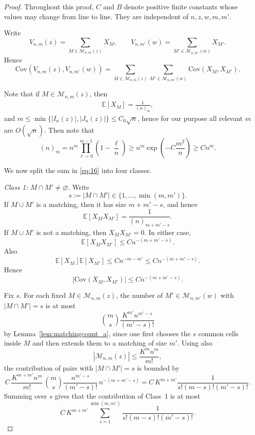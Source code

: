 \documentclass[11pt]{article}
\newcommand{\abs}[1]{| #1|}
\newcommand{\cov}{\mathrm{Cov}}
\begin{document}
\begin{proof} 
Throughout this proof, $C$ and $B$ denote positive finite constants whose values may change from line to line. They are independent of $n,z,w,m,m'$. 

Write
\[
V_{n,m}(z)=\sum_{M\in\mathcal M_{n,m}(z)} X_M,
\qquad
V_{n,m'}(w)=\sum_{M'\in\mathcal M_{n,m'}(w)} X_{M'}.
\]
Hence
\begin{equation}
\cov(V_{n,m}(z),V_{n,m'}(w))
=
\sum_{M\in\mathcal M_{n,m}(z)}
\sum_{M'\in\mathcal M_{n,m'}(w)}
\cov(X_M,X_{M'}).
\label{eq:16}
\end{equation}


Note that if $M\in \mathcal{M}_{n, m}(z)$, then 
\begin{align*}
    \mathbb{E}[X_M] = \frac{1}{(n)_m},
\end{align*}
and $m \leq \min\{\abs{I_n(z)}, \abs{J_n(z)}\} \leq C_0 \sqrt{n}$, hence for our purpose all relevant $m$ are $O(\sqrt{n})$. Then note that 
\[
(n)_m = n^m\prod_{\ell = 0}^{m - 1}\left(1 - \frac{\ell}{n}\right) \geq n^m\exp(-C\frac{m^2}{n}) \geq C n^m.
\]

We now split the sum in \eqref{eq:16} into four classes.

\smallskip
\noindent
\emph{Class 1: $M\cap M'\neq\varnothing$.}
Write
\[
s:=|M\cap M'|\in\{1,\dots,\min(m,m')\}.
\]
If $M\cup M'$ is a matching, then it has size $m+m'-s$, and hence
\[
\mathbb{E}[X_MX_{M'}]=\frac{1}{(n)_{m+m'-s}}.
\]
If $M\cup M'$ is not a matching, then $X_MX_{M'}=0$. In either case,
\[
\mathbb{E}[X_MX_{M'}]\le C n^{-(m+m'-s)}.
\]
Also
\[
\mathbb{E}[X_M]\mathbb{E}[X_{M'}]\le C n^{-m-m'}
\le C n^{-(m+m'-s)}.
\]
Hence
\[
|\cov(X_M,X_{M'})|\le C n^{-(m+m'-s)}.
\]

Fix $s$. For each fixed $M\in\mathcal M_{n,m}(z)$, the number of
$M'\in\mathcal M_{n,m'}(w)$ with $|M\cap M'|=s$ is at most
\[
\binom{m}{s}\frac{K^{m'} n^{m'-s}}{(m'-s)!}
\]
by Lemma~\ref{lem:matchingcount_a}, since one first chooses the $s$ common cells inside $M$ and then extends them
to a matching of size $m'$.
Using also
\[
|\mathcal M_{n,m}(z)|\le \frac{K^m n^m}{m!},
\]
the contribution of pairs with $|M\cap M'|=s$ is bounded by
\[
C\,
\frac{K^{m+m'} n^m}{m!}\,
\binom{m}{s}\frac{n^{m'-s}}{(m'-s)!}\,
n^{-(m+m'-s)}
=
C\,K^{m+m'}\frac{1}{s!(m-s)!(m'-s)!}.
\]
Summing over $s$ gives that the contribution of Class~1 is at most
\begin{equation}
C\,K^{m+m'}
\sum_{s=1}^{\min(m,m')}
\frac{1}{s!(m-s)!(m'-s)!}.
\end{equation}


\end{proof}
\end{document}
